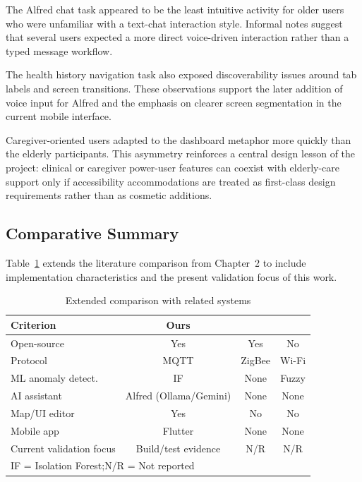 The Alfred chat task appeared to be the least intuitive activity for older users
who were unfamiliar with a text-chat interaction style. Informal notes suggest
that several users expected a more direct voice-driven interaction rather than a
typed message workflow.

The health history navigation task also exposed discoverability issues around tab
labels and screen transitions. These observations support the later addition of
voice input for Alfred and the emphasis on clearer screen segmentation in the
current mobile interface.

Caregiver-oriented users adapted to the dashboard metaphor more quickly than the
elderly participants. This asymmetry reinforces a central design lesson of the
project: clinical or caregiver power-user features can coexist with elderly-care
support only if accessibility accommodations are treated as first-class design
requirements rather than as cosmetic additions.

\subsection{Comparative Summary}

Table~\ref{tab:compare} extends the literature comparison from Chapter~2 to include
implementation characteristics and the present validation focus of this work.

\begin{table}[ht]
\centering
\caption{Extended comparison with related systems}
\label{tab:compare}
\begin{tabular}{lccc}
\toprule
\textbf{Criterion} & \textbf{Ours} & \cite{Alam2012} & \cite{Suryadevara2014} \\
\midrule
Open-source        & Yes    & Yes    & No \\
Protocol           & MQTT   & ZigBee & Wi-Fi \\
ML anomaly detect. & IF     & None   & Fuzzy \\
AI assistant       & Alfred (Ollama/Gemini) & None   & None \\
Map/UI editor      & Yes    & No     & No \\
Mobile app         & Flutter & None  & None \\
Current validation focus & Build/test evidence & N/R & N/R \\
\bottomrule
\multicolumn{4}{l}{\footnotesize IF = Isolation Forest;\quad N/R = Not reported}
\end{tabular}
\end{table}

